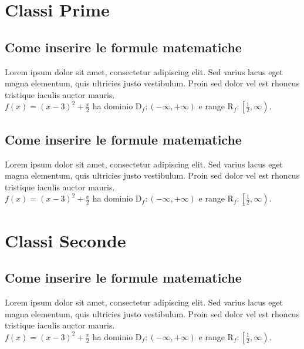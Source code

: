 \documentclass[11pt]{article}
\begin{document}

\section{Classi Prime}

\subsection{Come inserire le formule matematiche}
Lorem ipsum dolor sit amet, consectetur adipiscing elit. Sed varius lacus eget magna elementum, quis ultricies justo vestibulum. Proin sed dolor vel est rhoncus tristique iaculis auctor mauris.\\[3mm]
$f(x)=(x-3)^2+ \displaystyle \frac{x}{2}$ ha dominio $\mathrm{D}_f:(-\infty,+\infty)$
e range $\mathrm{R}_f:\left[\frac{1}{2},\infty\right)$.\\

\subsection{Come inserire le formule matematiche}
Lorem ipsum dolor sit amet, consectetur adipiscing elit. Sed varius lacus eget magna elementum, quis ultricies justo vestibulum. Proin sed dolor vel est rhoncus tristique iaculis auctor mauris.\\[3mm]
$f(x)=(x-3)^2+ \displaystyle \frac{x}{2}$ ha dominio $\mathrm{D}_f:(-\infty,+\infty)$
e range $\mathrm{R}_f:\left[\frac{1}{2},\infty\right)$.\\

\newpage
\section{Classi Seconde}

\subsection{Come inserire le formule matematiche}
Lorem ipsum dolor sit amet, consectetur adipiscing elit. Sed varius lacus eget magna elementum, quis ultricies justo vestibulum. Proin sed dolor vel est rhoncus tristique iaculis auctor mauris.\\[3mm]
$f(x)=(x-3)^2+ \displaystyle \frac{x}{2}$ ha dominio $\mathrm{D}_f:(-\infty,+\infty)$
e range $\mathrm{R}_f:\left[\frac{1}{2},\infty\right)$.\\
\end{document}
